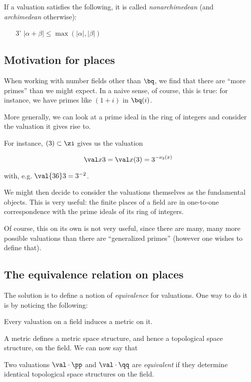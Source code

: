 If a valuation satisfies the following, it is called \textit{nonarchimedean}
(and \textit{archimedean} otherwise):

\begin{enumerate}
\item[3'] $|\alpha + \beta| \leq \max(|\alpha|,|\beta|)$
\end{enumerate}

\subsection{Motivation for places}
\label{sec:whatisaplace}
When working with number fields other than $\bq$, we find that there are ``more
primes'' than we might expect. In a naive sense, of course, this is true: for
instance, we have primes like $(1+i)$ in $\bq(i)$.

More generally, we can look at a prime ideal in the ring of integers and
consider the valuation it gives rise to.


For instance, $(3)\subset\zi$ gives us
the valuation

\[ \val x 3 = \val x {(3)} = 3^{-\nu_3(x)} \]

with, e.g. $ \val {36} 3 = 3^{-2} $.

We might then decide to consider the valuations themselves as the fundamental
objects. This is very useful: the finite places of a field are in one-to-one
correspondence with the prime ideals of its ring of integers. \cite{201565}

Of course, this on its own is not very useful, since there are many,
many more possible valuations than there are ``generalized primes'' (however one
wishes to define that).

\subsection{The equivalence relation on places}

The solution is to define a notion of \textit{equivalence} for valuations. One
way to do it is by noticing the following:

\begin{thm}
  Every valuation on a field induces a metric on it.
\end{thm}

A metric defines a metric space structure, and hence a topological space
structure, on the field. We can now say that

\begin{defn}
  Two valuations $\val \cdot \pp$ and $\val\cdot\qq$ are \textit{equivalent} if
  they determine identical topological space structures on the field.
\end{defn}

